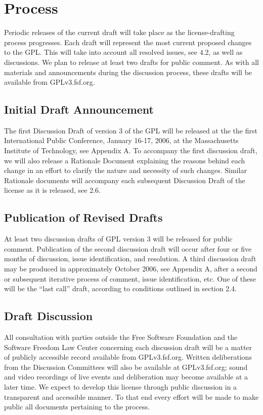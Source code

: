 \chapter{Process}

Periodic releases of the current draft will take place as the license-drafting
process progresses. Each draft will represent the most current proposed
changes to the GPL. This will take into account all resolved issues, see
4.2, as well as discussions. We plan to release at least two drafts for public
comment. As with all materials and announcements during the discussion
process, these drafts will be available from GPLv3.fsf.org.

\section{Initial Draft Announcement}

The first Discussion Draft of version 3 of the GPL will be released at the
the first International Public Conference, January 16-17, 2006, at the
Massachusetts Institute of Technology, see Appendix A. To accompany the
first discussion draft, we will also release a Rationale Document
explaining the reasons behind each change in an effort to clarify the
nature and necessity of such changes. Similar Rationale documents will
accompany each subsequent Discussion Draft of the license as it is released,
see 2.6.

\section{Publication of Revised Drafts}

At least two discussion drafts of GPL version 3 will be released for public
comment. Publication of the second discussion draft will occur after four
or five months of discussion, issue identification, and resolution. A third
discussion draft may be produced in approximately October 2006, see
Appendix A, after a second or subsequent iterative process of comment,
issue identification, etc. One of these will be the ``last call'' draft,
according to conditions outlined in section 2.4.

\section{Draft Discussion}

All consultation with parties outside the Free Software Foundation and the
Software Freedom Law Center concerning each discussion draft will be a
matter of publicly accessible record available from GPLv3.fsf.org. Written
deliberations from the Discussion Committees will also be available at
GPLv3.fsf.org; sound and video recordings of live events and deliberation
may become available at a later time. We expect to develop this license
through public discussion in a transparent and accessible manner. To that
end every effort will be made to make public all documents pertaining to
the process.


